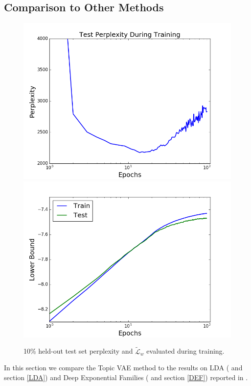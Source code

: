 \documentclass{report}
\begin{document}
	\subsection{Comparison to Other Methods}\label{comp_other}
	\begin{figure}
		\includegraphics[scale=0.45]{img/10pcperplex.png}
		\includegraphics[scale=0.45]{img/lbcompdef.png}
		\caption{10\% held-out test set perplexity and $\tilde{\mathcal{L}}_w$ evaluated during training.}
		\label{10pctoverfit}
	\end{figure}	
	In this section we compare the Topic VAE method to the results on LDA (\cite{blei2003latent} and section \ref{LDA}) and Deep Exponential Families (\cite{ranganath2015deep} and section \ref{DEF}) reported in \cite{ranganath2015deep}. 
\end{document}
